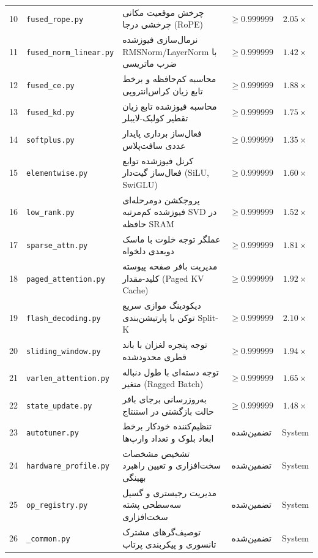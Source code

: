 \begin{center}
\begin{longtable}{r p{} p{} c c}
10 & \texttt{fused\_rope.py} & چرخش موقعیت مکانی چرخشی درجا (RoPE) & $\ge 0.999999$ & $2.05\times$ \\
11 & \texttt{fused\_norm\_linear.py} & نرمال‌سازی فیوزشده RMSNorm/LayerNorm با ضرب ماتریسی & $\ge 0.999999$ & $1.42\times$ \\
12 & \texttt{fused\_ce.py} & محاسبه کم‌حافظه و برخط تابع زیان کراس‌انتروپی & $\ge 0.999999$ & $1.88\times$ \\
13 & \texttt{fused\_kd.py} & محاسبه فیوزشده تابع زیان تقطیر کولبک-لایبلر & $\ge 0.999999$ & $1.75\times$ \\
14 & \texttt{softplus.py} & فعال‌ساز برداری پایدار عددی سافت‌پلاس & $\ge 0.999999$ & $1.35\times$ \\
15 & \texttt{elementwise.py} & کرنل فیوزشده توابع فعال‌ساز گیت‌دار (SiLU, SwiGLU) & $\ge 0.999999$ & $1.60\times$ \\
16 & \texttt{low\_rank.py} & پروجکشن دومرحله‌ای فیوزشده کم‌مرتبه SVD در حافظه SRAM & $\ge 0.999999$ & $1.52\times$ \\
17 & \texttt{sparse\_attn.py} & عملگر توجه خلوت با ماسک دو‌بعدی دلخواه & $\ge 0.999999$ & $1.81\times$ \\
18 & \texttt{paged\_attention.py} & مدیریت بافر صفحه پیوسته کلید-مقدار (Paged KV Cache) & $\ge 0.999999$ & $1.92\times$ \\
19 & \texttt{flash\_decoding.py} & دیکودینگ موازی سریع توکن با پارتیشن‌بندی Split-K & $\ge 0.999999$ & $2.10\times$ \\
20 & \texttt{sliding\_window.py} & توجه پنجره لغزان با باند قطری محدودشده & $\ge 0.999999$ & $1.94\times$ \\
21 & \texttt{varlen\_attention.py} & توجه دسته‌ای با طول دنباله متغیر (Ragged Batch) & $\ge 0.999999$ & $1.65\times$ \\
22 & \texttt{state\_update.py} & به‌روزرسانی برجای بافر حالت بازگشتی در استنتاج & $\ge 0.999999$ & $1.48\times$ \\
23 & \texttt{autotuner.py} & تنظیم‌کننده خودکار برخط ابعاد بلوک و تعداد وارپ‌ها & تضمین‌شده & System \\
24 & \texttt{hardware\_profile.py} & تشخیص مشخصات سخت‌افزاری و تعیین راهبرد بهینگی & تضمین‌شده & System \\
25 & \texttt{op\_registry.py} & مدیریت رجیستری و گسیل سه‌سطحی پشته سخت‌افزاری & تضمین‌شده & System \\
26 & \texttt{\_common.py} & توصیف‌گرهای مشترک تانسوری و پیکربندی پرتاب & تضمین‌شده & System \\
\end{longtable}
\end{center}
\clearpage

